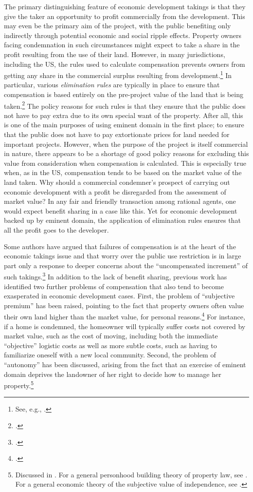 \documentclass[12pt,a4paper]{book} %
\begin{document}
The primary distinguishing feature of economic development takings is that they give the taker an opportunity to profit commercially from the development. This may even be the primary aim of the project, with the public benefiting only indirectly through potential economic and social ripple effects. Property owners facing condemnation in such circumstances might expect to take a share in the profit resulting from the use of their land. However, in many jurisdictions, including the US, the rules used to calculate compensation prevents owners from getting any share in the commercial surplus resulting from development.\footnote{See, e.g., \cite[965-966]{fennell04}.} In particular, various {\it elimination rules} are typically in place to ensure that compensation is based entirely on the pre-project value of the land that is being taken.\footcite[See][81]{ackerman06} The policy reasons for such rules is that they ensure that the public does not have to pay extra due to its own special want of the property. After all, this is one of the main purposes of using eminent domain in the first place; to ensure that the public does not have to pay extortionate prices for land needed for important projects. However, when the purpose of the project is itself commercial in nature, there appears to be a shortage of good policy reasons for excluding this value from consideration when compensation is calculated. This is especially true when, as in the US, compensation tends to be based on the market value of the land taken. Why should a commercial condemner's prospect of carrying out economic development with a profit be disregarded from the assessment of market value? In any fair and friendly transaction among rational agents, one would expect benefit sharing in a case like this. Yet for economic development backed up by eminent domain, the application of elimination rules ensures that all the profit goes to the developer. 

Some authors have argued that failures of compensation is at the heart of the economic takings issue and that worry over the public use restriction is in large part only a response to deeper concerns about the ``uncompensated increment'' of such takings.\footcite[See][962]{fennell04} In addition to the lack of benefit sharing, previous work has identified two further problems of compensation that also tend to become exasperated in economic development cases. First, the problem of ``subjective premium'' has been raised, pointing to the fact that property owners often value their own land higher than the market value, for personal reasons.\footcite[963]{fennell04} For instance, if a home is condemned, the homeowner will typically suffer costs not covered by market value, such as the cost of moving, including both the immediate ``objective'' logistic costs as well as more subtle costs, such as having to familiarize oneself with a new local community. Second, the problem of ``autonomy'' has been discussed, arising from the fact that an exercise of eminent domain deprives the landowner of her right to decide how to manage her property.\footnote{Discussed in \cite[966-967]{fennell04}. For a general personhood building theory of property law, see \cite{radin93}. For a general economic theory of the subjective value of independence, see \cite{benz08}.}
\end{document}
